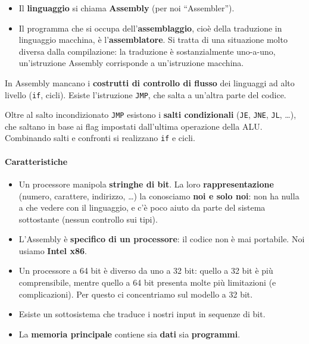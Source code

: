 \documentclass[11pt,a4paper]{article}
\begin{document}
	\begin{itemize}[leftmargin=*]
		\item Il \textbf{linguaggio} si chiama \textbf{Assembly} (per noi ``Assembler'').
		\item Il programma che si occupa dell'\textbf{assemblaggio}, cioè della traduzione in linguaggio macchina, è l'\textbf{assemblatore}. Si tratta di una situazione molto diversa dalla compilazione: la traduzione è sostanzialmente uno-a-uno, un'istruzione Assembly corrisponde a un'istruzione macchina.
	\end{itemize}
	
	\begin{nota}
		In Assembly mancano i \textbf{costrutti di controllo di flusso} dei linguaggi ad alto livello (\texttt{if}, cicli). Esiste l'istruzione \texttt{JMP}, che salta a un'altra parte del codice.
	\end{nota}
	
	\begin{integrazione}
		Oltre al salto incondizionato \texttt{JMP} esistono i \textbf{salti condizionali} (\texttt{JE}, \texttt{JNE}, \texttt{JL}, \ldots), che saltano in base ai flag impostati dall'ultima operazione della ALU. Combinando salti e confronti si realizzano \texttt{if} e cicli.
	\end{integrazione}
	
	\paragraph*{Caratteristiche}
	
	\begin{itemize}[leftmargin=*]
		\item Un processore manipola \textbf{stringhe di bit}. La loro \textbf{rappresentazione} (numero, carattere, indirizzo, \ldots) la conosciamo \textbf{noi e solo noi}: non ha nulla a che vedere con il linguaggio, e c'è poco aiuto da parte del sistema sottostante (nessun controllo sui tipi).
		\item L'Assembly è \textbf{specifico di un processore}: il codice non è mai portabile. Noi usiamo \textbf{Intel x86}.
		\item Un processore a 64 bit è diverso da uno a 32 bit: quello a 32 bit è più comprensibile, mentre quello a 64 bit presenta molte più limitazioni (e complicazioni). Per questo ci concentriamo sul modello a 32 bit.
		\item Esiste un sottosistema che traduce i nostri input in sequenze di bit.
		\item La \textbf{memoria principale} contiene sia \textbf{dati} sia \textbf{programmi}.
	\end{itemize}
	
\end{document}
